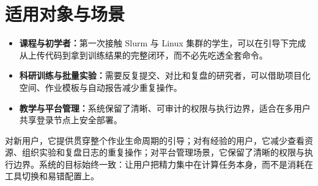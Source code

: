 \documentclass[UTF8,11pt,a4paper]{ctexart}
\begin{document}
\section{适用对象与场景}
\begin{itemize}
  \item \textbf{课程与初学者：}第一次接触 Slurm 与 Linux 集群的学生，可以在引导下完成从上传代码到拿到训练结果的完整闭环，而不必先吃透全套命令。
  \item \textbf{科研训练与批量实验：}需要反复提交、对比和复盘的研究者，可以借助项目化空间、作业模板与自动报告减少重复操作。
  \item \textbf{教学与平台管理：}系统保留了清晰、可审计的权限与执行边界，适合在多用户共享登录节点上安全部署。
\end{itemize}

对新用户，它提供贯穿整个作业生命周期的引导；对有经验的用户，它减少查看资源、组织实验和复盘日志的重复操作；对平台管理场景，它保留了清晰的权限与执行边界。系统的目标始终一致：让用户把精力集中在计算任务本身，而不是消耗在工具切换和易错配置上。
\end{document}
